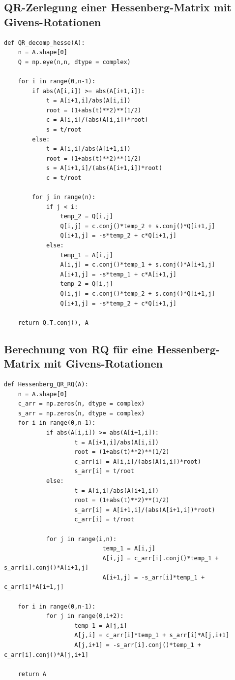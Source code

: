 \documentclass{article}
\theoremstyle{plain}
\begin{document}
\newpage
\subsection*{QR-Zerlegung einer Hessenberg-Matrix mit Givens-Rotationen}


\begin{lstlisting}
def QR_decomp_hesse(A):
    n = A.shape[0]
    Q = np.eye(n,n, dtype = complex)

    for i in range(0,n-1):
        if abs(A[i,i]) >= abs(A[i+1,i]):
            t = A[i+1,i]/abs(A[i,i])
            root = (1+abs(t)**2)**(1/2)
            c = A[i,i]/(abs(A[i,i])*root)
            s = t/root
        else:
            t = A[i,i]/abs(A[i+1,i])
            root = (1+abs(t)**2)**(1/2)
            s = A[i+1,i]/(abs(A[i+1,i])*root)
            c = t/root

        for j in range(n):
            if j < i:
                temp_2 = Q[i,j]
                Q[i,j] = c.conj()*temp_2 + s.conj()*Q[i+1,j]
                Q[i+1,j] = -s*temp_2 + c*Q[i+1,j]
            else:
                temp_1 = A[i,j]
                A[i,j] = c.conj()*temp_1 + s.conj()*A[i+1,j]
                A[i+1,j] = -s*temp_1 + c*A[i+1,j]
                temp_2 = Q[i,j]
                Q[i,j] = c.conj()*temp_2 + s.conj()*Q[i+1,j]
                Q[i+1,j] = -s*temp_2 + c*Q[i+1,j]

    return Q.T.conj(), A
\end{lstlisting}

\newpage
\subsection*{Berechnung von RQ für eine Hessenberg-Matrix mit Givens-Rotationen}

\begin{lstlisting}
def Hessenberg_QR_RQ(A):
	n = A.shape[0]
	c_arr = np.zeros(n, dtype = complex)
	s_arr = np.zeros(n, dtype = complex)
	for i in range(0,n-1):
			if abs(A[i,i]) >= abs(A[i+1,i]):
					t = A[i+1,i]/abs(A[i,i])
					root = (1+abs(t)**2)**(1/2)
					c_arr[i] = A[i,i]/(abs(A[i,i])*root)
					s_arr[i] = t/root
			else:
					t = A[i,i]/abs(A[i+1,i])
					root = (1+abs(t)**2)**(1/2)
					s_arr[i] = A[i+1,i]/(abs(A[i+1,i])*root)
					c_arr[i] = t/root

			for j in range(i,n):
							temp_1 = A[i,j]
							A[i,j] = c_arr[i].conj()*temp_1 + s_arr[i].conj()*A[i+1,j]
							A[i+1,j] = -s_arr[i]*temp_1 + c_arr[i]*A[i+1,j]

	for i in range(0,n-1):
			for j in range(0,i+2):
					temp_1 = A[j,i]
					A[j,i] = c_arr[i]*temp_1 + s_arr[i]*A[j,i+1]
					A[j,i+1] = -s_arr[i].conj()*temp_1 + c_arr[i].conj()*A[j,i+1]

	return A
\end{lstlisting}
\end{document}
